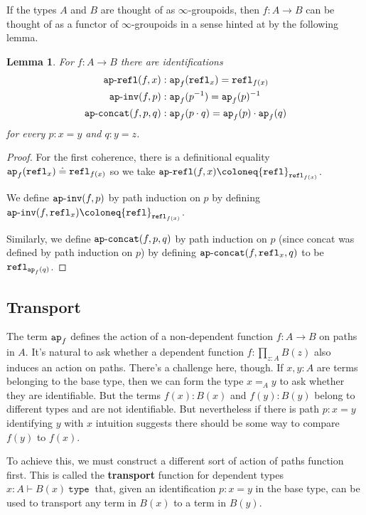\documentclass{amsart}
\theoremstyle{theorem}
\newtheorem*{lem}{Lemma}
\theoremstyle{definition}
\theoremstyle{remark}
\newcommand{\0}{\mathbbe{0}}
\newcommand{\1}{\mathbbe{1}}
\newcommand{\2}{\mathbbe{2}}
\newcommand{\3}{\mathbbe{3}}
\newcommand{\4}{\mathbbe{4}}
\newcommand{\univ}{{~\texttt{type}~}}
\newcommand{\term}[1]{{\textup{\texttt{#1}}}}
\newcommand{\refl}{\term{refl}}
\newcommand{\ap}{\term{ap}}
\newcommand{\apcoh}[1]{\term{ap}\text{-}\term{#1}}
\begin{document}
If the types $A$ and $B$ are thought of as $\infty$-groupoids, then $f \colon A \to B$ can be thought of as a functor of $\infty$-groupoids in a sense hinted at by the following lemma.

\begin{lem} For $f \colon A \to B$ there are identifications
\begin{align*}
\apcoh{refl}(f,x) &: \ap_f (\refl_x) = \refl_{f(x)} \\
\apcoh{inv}(f,p) &: \ap_f (p^{-1}) = \ap_f(p)^{-1} \\
\apcoh{concat}(f,p,q) &: \ap_f(p \cdot q) = \ap_f(p) \cdot \ap_f(q)
\end{align*}
for every $p : x= y$ and $q: y = z$.
\end{lem}
\begin{proof}
For the first coherence, there is a definitional equality $\ap_f (\refl_x) \doteq \refl_{f(x)}$ so we take $\apcoh{refl}(f,x) \coloneq \refl_{\refl_{f(x)}}$. 

We define $\apcoh{inv}(f,p)$ by path induction on $p$ by defining $\apcoh{inv}(f,\refl_x) \coloneq \refl_{\refl_{f(x)}}$.

Similarly, we define $\apcoh{concat}(f,p,q)$ by path induction on $p$ (since concat was defined by path induction on $p$) by defining $\apcoh{concat}(f,\refl_x,q)$ to be $\refl_{\ap_f(q)}$.
\end{proof}

\subsection*{Transport}

The term $\ap_f$ defines the action of a non-dependent function $f \colon A \to B$ on paths in $A$. It's natural to ask whether a dependent function $f : \prod_{z:A}B(z)$ also induces an action on paths. There's a challenge here, though. If $x,y : A$ are terms belonging to the base type, then we can form the type $x=_A y$ to ask whether they are identifiable. But the terms $f(x) : B(x)$ and $f(y) : B(y)$  belong to different types and are not identifiable. But nevertheless if there is  path $p : x = y$ identifying $y$ with $x$ intuition suggests there should be some way to compare $f(y)$ to $f(x)$.

To achieve this, we must construct a different sort of action of paths function first. This is called the  \textbf{transport} function for dependent types $x :A \vdash B(x) \univ$ that, given an identification $p : x = y$ in the base type, can be used to transport any term in $B(x)$ to a term in $B(y)$.
\end{document}
